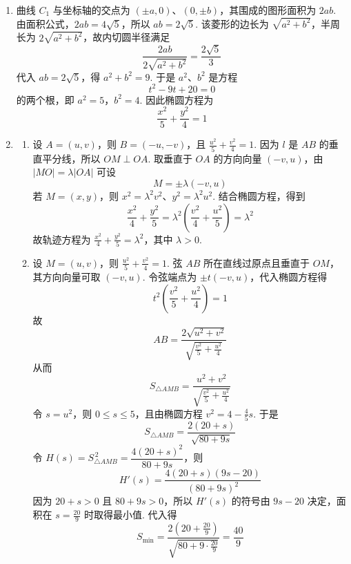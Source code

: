 \begin{solution}
\begin{enumerate}
\item 曲线 \(C_1\) 与坐标轴的交点为 \((\pm a,0)\)、\((0,\pm b)\)，其围成的图形面积为 \(2ab\). 由面积公式，\(2ab=4\sqrt5\)，所以 \(ab=2\sqrt5\). 该菱形的边长为 \(\sqrt{a^2+b^2}\)，半周长为 \(2\sqrt{a^2+b^2}\)，故内切圆半径满足
\[
\frac{2ab}{2\sqrt{a^2+b^2}}=\frac{2\sqrt5}{3}
\]
代入 \(ab=2\sqrt5\)，得 \(a^2+b^2=9\). 于是 \(a^2\)、\(b^2\) 是方程
\[
t^2-9t+20=0
\]
的两个根，即 \(a^2=5\)，\(b^2=4\). 因此椭圆方程为
\[
\frac{x^2}{5}+\frac{y^2}{4}=1
\]
\item
\begin{enumerate}
\item 设 \(A=(u,v)\)，则 \(B=(-u,-v)\)，且 \(\frac{u^2}{5}+\frac{v^2}{4}=1\). 因为 \(l\) 是 \(AB\) 的垂直平分线，所以 \(OM\perp OA\). 取垂直于 \(OA\) 的方向向量 \((-v,u)\)，由 \(|MO|=\lambda|OA|\) 可设
\[
M=\pm\lambda(-v,u)
\]
若 \(M=(x,y)\)，则 \(x^2=\lambda^2v^2\)、\(y^2=\lambda^2u^2\). 结合椭圆方程，得到
\[
\frac{x^2}{4}+\frac{y^2}{5}
=\lambda^2\left(\frac{v^2}{4}+\frac{u^2}{5}\right)
=\lambda^2
\]
故轨迹方程为 \(\frac{x^2}{4}+\frac{y^2}{5}=\lambda^2\)，其中 \(\lambda>0\).

\item 设 \(M=(u,v)\)，则 \(\frac{u^2}{5}+\frac{v^2}{4}=1\). 弦 \(AB\) 所在直线过原点且垂直于 \(OM\)，其方向向量可取 \((-v,u)\). 令弦端点为 \(\pm t(-v,u)\)，代入椭圆方程得
\[
t^2\left(\frac{v^2}{5}+\frac{u^2}{4}\right)=1
\]
故
\[
AB=\frac{2\sqrt{u^2+v^2}}{\sqrt{\frac{v^2}{5}+\frac{u^2}{4}}}
\]
从而
\[
S_{\triangle AMB}=\frac{u^2+v^2}{\sqrt{\frac{v^2}{5}+\frac{u^2}{4}}}
\]
令 \(s=u^2\)，则 \(0\leqslant s\leqslant5\)，且由椭圆方程 \(v^2=4-\frac45s\). 于是
\[
S_{\triangle AMB}=\frac{2(20+s)}{\sqrt{80+9s}}
\]
令 \(H(s)=S_{\triangle AMB}^{\,2}=\dfrac{4(20+s)^2}{80+9s}\)，则
\[
H'(s)=\frac{4(20+s)(9s-20)}{(80+9s)^2}
\]
因为 \(20+s>0\) 且 \(80+9s>0\)，所以 \(H'(s)\) 的符号由 \(9s-20\) 决定，面积在 \(s=\frac{20}{9}\) 时取得最小值. 代入得
\[
S_{\min}=\frac{2\left(20+\frac{20}{9}\right)}{\sqrt{80+9\cdot\frac{20}{9}}}
=\frac{40}{9}
\]
\end{enumerate}
\end{enumerate}
\end{solution}
